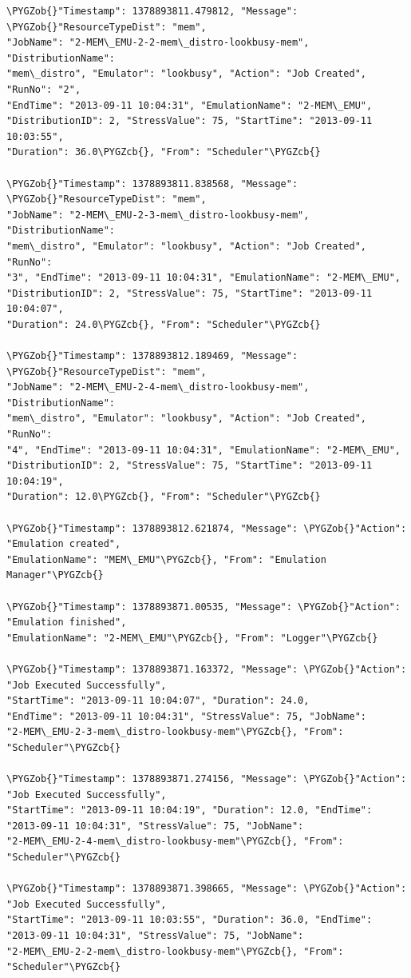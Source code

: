 \documentclass[letterpaper,10pt,english]{sphinxhowto}
\def\PYGZob{\char`\{}
\def\PYGZcb{\char`\}}
\begin{document}
\begin{Verbatim}[commandchars=\\\{\}]
\PYGZob{}"Timestamp": 1378893811.479812, "Message": \PYGZob{}"ResourceTypeDist": "mem",
"JobName": "2-MEM\_EMU-2-2-mem\_distro-lookbusy-mem", "DistributionName":
"mem\_distro", "Emulator": "lookbusy", "Action": "Job Created", "RunNo": "2",
"EndTime": "2013-09-11 10:04:31", "EmulationName": "2-MEM\_EMU",
"DistributionID": 2, "StressValue": 75, "StartTime": "2013-09-11 10:03:55",
"Duration": 36.0\PYGZcb{}, "From": "Scheduler"\PYGZcb{}

\PYGZob{}"Timestamp": 1378893811.838568, "Message": \PYGZob{}"ResourceTypeDist": "mem",
"JobName": "2-MEM\_EMU-2-3-mem\_distro-lookbusy-mem", "DistributionName":
"mem\_distro", "Emulator": "lookbusy", "Action": "Job Created", "RunNo":
"3", "EndTime": "2013-09-11 10:04:31", "EmulationName": "2-MEM\_EMU",
"DistributionID": 2, "StressValue": 75, "StartTime": "2013-09-11 10:04:07",
"Duration": 24.0\PYGZcb{}, "From": "Scheduler"\PYGZcb{}

\PYGZob{}"Timestamp": 1378893812.189469, "Message": \PYGZob{}"ResourceTypeDist": "mem",
"JobName": "2-MEM\_EMU-2-4-mem\_distro-lookbusy-mem", "DistributionName":
"mem\_distro", "Emulator": "lookbusy", "Action": "Job Created", "RunNo":
"4", "EndTime": "2013-09-11 10:04:31", "EmulationName": "2-MEM\_EMU",
"DistributionID": 2, "StressValue": 75, "StartTime": "2013-09-11 10:04:19",
"Duration": 12.0\PYGZcb{}, "From": "Scheduler"\PYGZcb{}

\PYGZob{}"Timestamp": 1378893812.621874, "Message": \PYGZob{}"Action": "Emulation created",
"EmulationName": "MEM\_EMU"\PYGZcb{}, "From": "Emulation Manager"\PYGZcb{}

\PYGZob{}"Timestamp": 1378893871.00535, "Message": \PYGZob{}"Action": "Emulation finished",
"EmulationName": "2-MEM\_EMU"\PYGZcb{}, "From": "Logger"\PYGZcb{}

\PYGZob{}"Timestamp": 1378893871.163372, "Message": \PYGZob{}"Action": "Job Executed Successfully",
"StartTime": "2013-09-11 10:04:07", "Duration": 24.0,
"EndTime": "2013-09-11 10:04:31", "StressValue": 75, "JobName":
"2-MEM\_EMU-2-3-mem\_distro-lookbusy-mem"\PYGZcb{}, "From": "Scheduler"\PYGZcb{}

\PYGZob{}"Timestamp": 1378893871.274156, "Message": \PYGZob{}"Action": "Job Executed Successfully",
"StartTime": "2013-09-11 10:04:19", "Duration": 12.0, "EndTime":
"2013-09-11 10:04:31", "StressValue": 75, "JobName":
"2-MEM\_EMU-2-4-mem\_distro-lookbusy-mem"\PYGZcb{}, "From": "Scheduler"\PYGZcb{}

\PYGZob{}"Timestamp": 1378893871.398665, "Message": \PYGZob{}"Action": "Job Executed Successfully",
"StartTime": "2013-09-11 10:03:55", "Duration": 36.0, "EndTime":
"2013-09-11 10:04:31", "StressValue": 75, "JobName":
"2-MEM\_EMU-2-2-mem\_distro-lookbusy-mem"\PYGZcb{}, "From": "Scheduler"\PYGZcb{}


\end{Verbatim}
\end{document}
